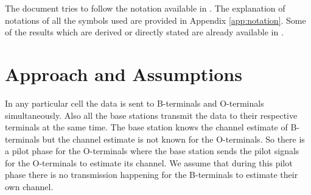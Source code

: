 \documentclass[10pt, a4paper, twoside,fleqn]{article}
\begin{document}
	The document tries to follow the notation available in \cite{bib:MassiveMimoBook}. The explanation of notations of all the symbols used are provided in Appendix \ref{app:notation}. Some of the results which are derived or directly stated are already available in \cite{bib:MassiveMimoBook}.

\section{Approach and Assumptions}	
	In any particular cell the data is sent to B-terminals and O-terminals simultaneously. Also all the base stations transmit the data to their respective terminals at the same time. The base station knows the channel estimate of B-terminals but the channel estimate is not known for the O-terminals. So there is a pilot phase for the O-terminals where the base station sends the pilot signals for the O-terminals to estimate its channel. We assume that during this pilot phase there is no transmission happening for the B-terminals to estimate their own channel.
\end{document}
